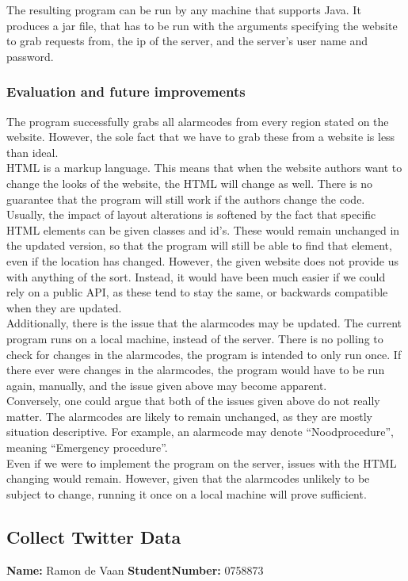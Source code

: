 The resulting program can be run by any machine that supports Java.
It produces a jar file, that has to be run with the arguments specifying the website to grab requests from,
the ip of the server, and the server's user name and password. 

\subsubsection*{Evaluation and future improvements}
The program successfully grabs all alarmcodes from every region stated on the website.
However, the sole fact that we have to grab these from a website is less than ideal. \\
HTML is a markup language.
This means that when the website authors want to change the looks of the website, the HTML will change as well.
There is no guarantee that the program will still work if the authors change the code.
Usually, the impact of layout alterations is softened by the fact that specific HTML elements can be given classes and id's.
These would remain unchanged in the updated version, so that the program will still be able to find that element, even if the location has changed.
However, the given website does not provide us with anything of the sort.
Instead, it would have been much easier if we could rely on a public API, as these tend to stay the same, or backwards compatible when they are updated. \\

Additionally, there is the issue that the alarmcodes may be updated.
The current program runs on a local machine, instead of the server.
There is no polling to check for changes in the alarmcodes, the program is intended to only run once.
If there ever were changes in the alarmcodes, the program would have to be run again, manually, and the issue given above may become apparent. \\

Conversely, one could argue that both of the issues given above do not really matter.
The alarmcodes are likely to remain unchanged, as they are mostly situation descriptive.
For example, an alarmcode may denote ``Noodprocedure'', meaning ``Emergency procedure''. \\
Even if we were to implement the program on the server, issues with the HTML changing would remain.
However, given that the alarmcodes unlikely to be subject to change, running it once on a local machine will prove sufficient.

\subsection*{Collect Twitter Data}
\textbf{Name:} Ramon de Vaan \indent \textbf{StudentNumber:} 0758873

